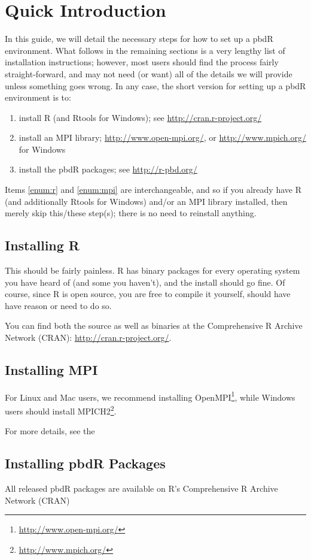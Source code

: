\section{Quick Introduction}

In this guide, we will detail the necessary steps for how to set up a pbdR environment.  What follows in the remaining sections is a very lengthy list of installation instructions; however, most users should find the process fairly straight-forward, and may not need (or want) all of the details we will provide unless something goes wrong.  In any case, the short version for setting up a pbdR environment is to:
\begin{enumerate}
  \item install R (and Rtools for Windows)\label{enum:r}; see \url{http://cran.r-project.org/}
  \item install an MPI library\label{enum:mpi}; \url{http://www.open-mpi.org/}, or \url{http://www.mpich.org/} for Windows
  \item install the pbdR packages; see \url{http://r-pbd.org/}
\end{enumerate}

Items \ref{enum:r} and \ref{enum:mpi} are interchangeable, and so if you already have R (and additionally Rtools for Windows) and/or an MPI library installed, then merely skip this/these step(s); there is no need to reinstall anything.

\subsection{Installing R}
This should be fairly painless.  R has binary packages for every operating system you have heard of (and some you haven't), and the install should go fine.  Of course, since R is open source, you are free to compile it yourself, should have have reason or need to do so.

You can find both the source as well as binaries at the Comprehensive R Archive Network (CRAN): \url{http://cran.r-project.org/}.


\subsection{Installing MPI}


For Linux and Mac users, we recommend installing OpenMPI\footnote{\url{http://www.open-mpi.org/}}, while Windows users should install MPICH2\footnote{\url{http://www.mpich.org/}}.

For more details, see the 


\subsection{Installing pbdR Packages}
All released pbdR packages are available on R's Comprehensive R Archive Network (CRAN)